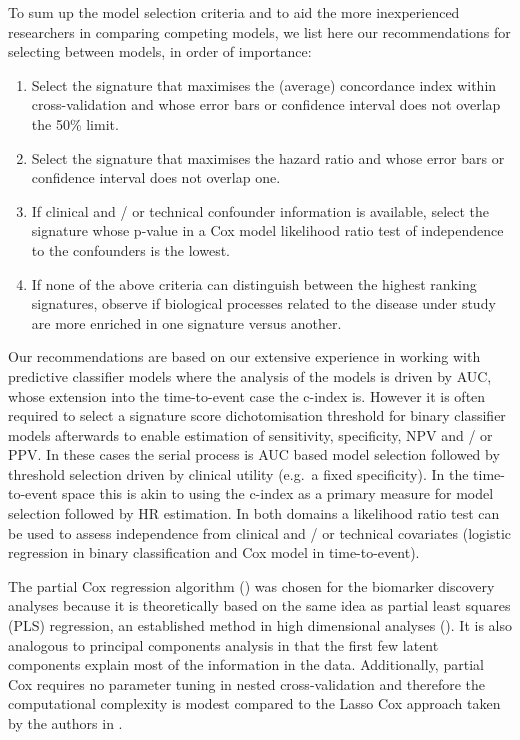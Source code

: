 \documentclass[letterpaper,12pt]{article}
\begin{document}
To sum up the model selection criteria and to aid the more inexperienced researchers in comparing competing models, we list here our recommendations for selecting between models, in order of importance:
\begin{enumerate}
  \item Select the signature that maximises the (average) concordance index within cross-validation and whose error bars or confidence interval does not overlap the 50\% limit.
  \item Select the signature that maximises the hazard ratio and whose error bars or confidence interval does not overlap one. 
  \item If clinical and / or technical confounder information is available, select the signature whose p-value in a Cox model likelihood ratio test of independence to the confounders is the lowest.
  \item If none of the above criteria can distinguish between the highest ranking signatures, observe if biological processes related to the disease under study are more enriched in one signature versus another.
\end{enumerate}
Our recommendations are based on our extensive experience in working with predictive classifier models where the analysis of the models is driven by AUC, whose extension into the time-to-event case the c-index is. However it is often required to select a signature score dichotomisation threshold for binary classifier models afterwards to enable estimation of sensitivity, specificity, NPV and / or PPV. In these cases the serial process is AUC based model selection followed by threshold selection driven by clinical utility (e.g.\ a fixed specificity). In the time-to-event space this is akin to using the c-index as a primary measure for model selection followed by HR estimation. In both domains a likelihood ratio test can be used to assess independence from clinical and / or technical covariates (logistic regression in binary classification and Cox model in time-to-event). 

The partial Cox regression algorithm (\citet{Li:04}) was chosen for the biomarker discovery analyses because it is theoretically based on the same idea as partial least squares (PLS) regression, an established method in high dimensional analyses (\citet{Boulesteix:06}). It is also analogous to principal components analysis in that the first few latent components explain most of the information in the data. Additionally, partial Cox requires no parameter tuning in nested cross-validation and therefore the computational complexity is modest compared to the Lasso Cox approach taken by the authors in \citet{Kammers:11}. 
\end{document}
